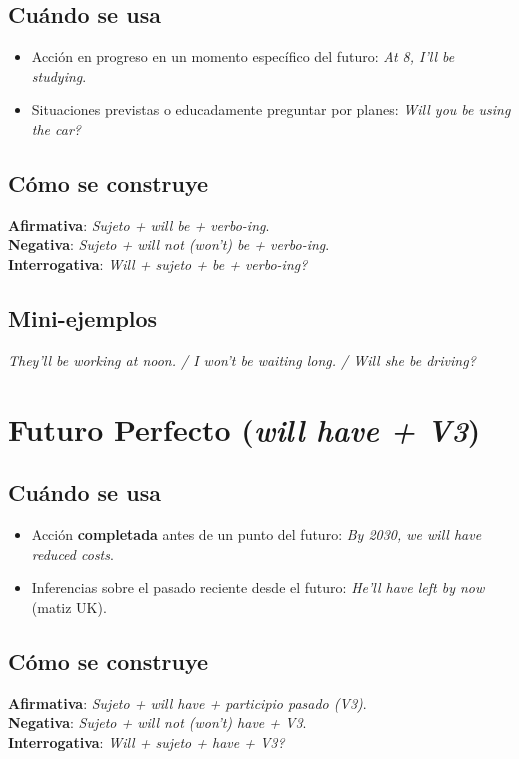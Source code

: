 \documentclass[11pt,a4paper]{article}
\begin{document}
\subsection*{Cuándo se usa}
\begin{itemize}
  \item Acción en progreso en un momento específico del futuro: \emph{At 8, I’ll be studying}.
  \item Situaciones previstas o educadamente preguntar por planes: \emph{Will you be using the car?}
\end{itemize}

\subsection*{Cómo se construye}
\textbf{Afirmativa}: \emph{Sujeto + will be + verbo-ing}.\\
\textbf{Negativa}: \emph{Sujeto + will not (won’t) be + verbo-ing}.\\
\textbf{Interrogativa}: \emph{Will + sujeto + be + verbo-ing?}

\subsection*{Mini-ejemplos}
\emph{They’ll be working at noon. / I won’t be waiting long. / Will she be driving?}

\section{Futuro Perfecto (\emph{will have + V3})}
\subsection*{Cuándo se usa}
\begin{itemize}
  \item Acción \textbf{completada} antes de un punto del futuro: \emph{By 2030, we will have reduced costs}.
  \item Inferencias sobre el pasado reciente desde el futuro: \emph{He’ll have left by now} (matiz UK).
\end{itemize}

\subsection*{Cómo se construye}
\textbf{Afirmativa}: \emph{Sujeto + will have + participio pasado (V3)}.\\
\textbf{Negativa}: \emph{Sujeto + will not (won’t) have + V3}.\\
\textbf{Interrogativa}: \emph{Will + sujeto + have + V3?}
\end{document}
